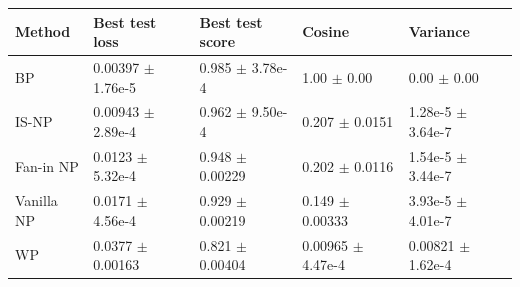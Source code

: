 \begin{tabular}{lllll}
\toprule
Method & Best test loss & Best test score & Cosine & Variance \\
\midrule
BP & 0.00397 $\pm$ 1.76e-5 & 0.985 $\pm$ 3.78e-4 & 1.00 $\pm$ 0.00 & 0.00 $\pm$ 0.00 \\
IS-NP & 0.00943 $\pm$ 2.89e-4 & 0.962 $\pm$ 9.50e-4 & 0.207 $\pm$ 0.0151 & 1.28e-5 $\pm$ 3.64e-7 \\
Fan-in NP & 0.0123 $\pm$ 5.32e-4 & 0.948 $\pm$ 0.00229 & 0.202 $\pm$ 0.0116 & 1.54e-5 $\pm$ 3.44e-7 \\
Vanilla NP & 0.0171 $\pm$ 4.56e-4 & 0.929 $\pm$ 0.00219 & 0.149 $\pm$ 0.00333 & 3.93e-5 $\pm$ 4.01e-7 \\
WP & 0.0377 $\pm$ 0.00163 & 0.821 $\pm$ 0.00404 & 0.00965 $\pm$ 4.47e-4 & 0.00821 $\pm$ 1.62e-4 \\
\bottomrule
\end{tabular}
